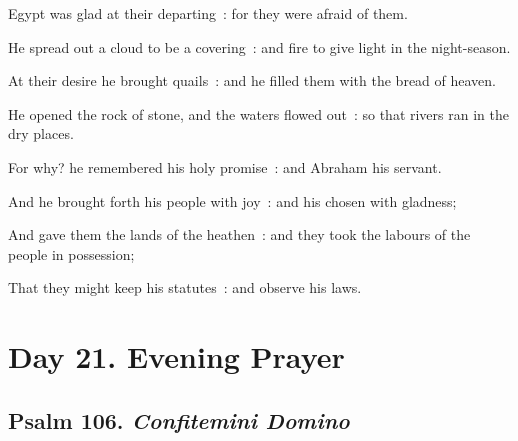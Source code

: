 Egypt was glad at their departing~: for they were afraid of them.\par
{}He spread out a cloud to be a covering~: and fire to give light in the night-season.\par
{}At their desire he brought quails~: and he filled them with the bread of heaven.\par
{}He opened the rock of stone, and the waters flowed out~: so that rivers ran in the dry places.\par
{}For why? he remembered his holy promise~: and Abraham his servant.\par
{}And he brought forth his people with joy~: and his chosen with gladness;\par
{}And gave them the lands of the heathen~: and they took the labours of the people in possession;\par
{}That they might keep his statutes~: and observe his laws.\par

\section*{Day 21. Evening Prayer}

\subsection{Psalm 106. \textit{Confitemini Domino}}

